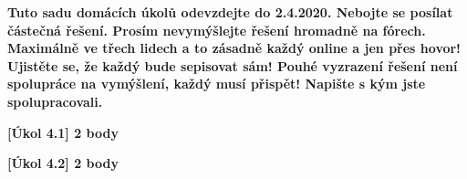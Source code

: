 \textbf{
	Tuto sadu domácích úkolů odevzdejte do 2.4.2020.
	Nebojte se posílat částečná řešení.
	Prosím nevymýšlejte řešení hromadně na fórech.
	Maximálně ve třech lidech a to zásadně každý online a jen přes hovor!
	Ujistěte se, že každý bude sepisovat sám!
	Pouhé vyzrazení řešení není spolupráce na vymýšlení, každý musí přispět!
	Napište s kým jste spolupracovali.
}

\textbf{[Úkol 4.1] 2 body}

\textbf{[Úkol 4.2] 2 body}


